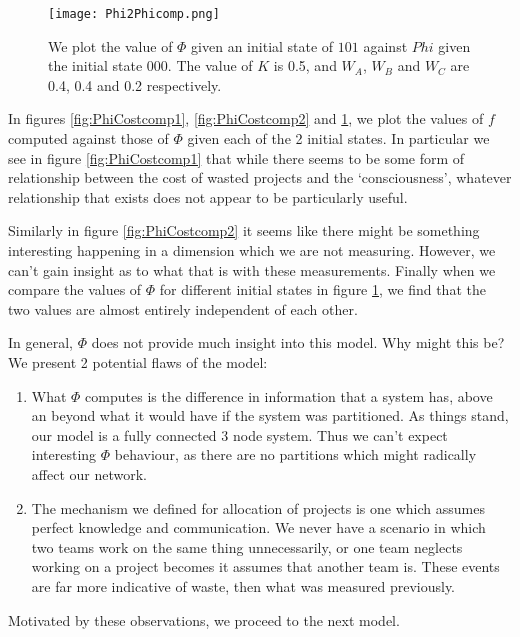 \begin{figure}[!ht]
	\centering
	\texttt{[image: Phi2Phicomp.png]}
	\caption{We plot the value of $\Phi$ given an initial state of $101$ against $Phi$ given the initial state $000$. The value of $K$ is 0.5, and $W_A$, $W_B$ and $W_C$ are 0.4, 0.4 and 0.2 respectively. }
	\label{fig:Ph2Phicomp}
\end{figure}

In figures \ref{fig:PhiCostcomp1}, \ref{fig:PhiCostcomp2} and \ref{fig:Ph2Phicomp}, we plot the values of $f$ computed against those of $\Phi$ given each of the 2 initial states. In particular we see in figure \ref{fig:PhiCostcomp1} that while there seems to be some form of relationship between the cost of wasted projects and the `consciousness', whatever relationship that exists does not appear to be particularly useful. 

Similarly in figure \ref{fig:PhiCostcomp2} it seems like there might be something interesting happening in a dimension which we are not measuring. However, we can't gain insight as to what that is with these measurements. Finally when we compare the values of $\Phi$ for different initial states in figure \ref{fig:Ph2Phicomp}, we find that the two values are almost entirely independent of each other. 

In general, $\Phi$ does not provide much insight into this model. Why might this be? We present 2 potential flaws of the model:

\begin{enumerate}
	\item What $\Phi$ computes is the difference in information that a system has, above an beyond what it would have if the system was partitioned. As things stand, our model is a fully connected 3 node system. Thus we can't expect interesting $\Phi$ behaviour, as there are no partitions which might radically affect our network. 

	\item The mechanism we defined for allocation of projects is one which assumes perfect knowledge and communication. We never have a scenario in which two teams work on the same thing unnecessarily, or one team neglects working on a project becomes it assumes that another team is. These events are far more indicative of waste, then what was measured previously. 

\end{enumerate}

Motivated by these observations, we proceed to the next model.



